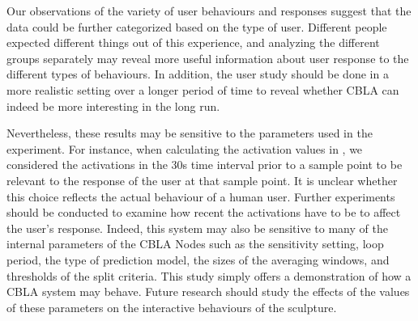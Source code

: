 Our observations of the variety of user behaviours and responses suggest that the data could be further categorized based on the type of user. Different people expected different things out of this experience, and analyzing the different groups separately may reveal more useful information about user response to the different types of behaviours. In addition, the user study should be done in a more realistic setting over a longer period of time to reveal whether CBLA can indeed be more interesting in the long run.


Nevertheless, these results may be sensitive to the parameters used in the experiment. For instance, when calculating the activation values in , we considered the activations in the 30s time interval prior to a sample point to be relevant to the response of the user at that sample point. It is unclear whether this choice reflects the actual behaviour of a human user. Further experiments should be conducted to examine how recent the activations have to be to affect the user's response. Indeed, this system may also be sensitive to many of the internal parameters of the CBLA Nodes such as the sensitivity setting, loop period, the type of prediction model, the sizes of the averaging windows, and thresholds of the split criteria. This study simply offers a demonstration of how a CBLA system may behave. Future research should study the effects of the values of these parameters on the interactive behaviours of the sculpture. 